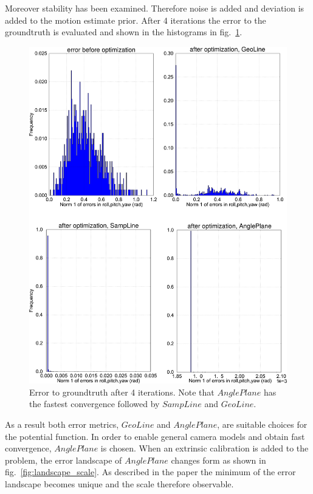 \documentclass[a4paper]{article}
\begin{document}
Moreover stability has been examined. Therefore noise is added and deviation is added to the motion estimate prior.
After 4 iterations the error to the groundtruth is evaluated and shown in the histograms in fig.~\ref{fig:histograms}.

\begin{figure}[htb]
\centering
\includegraphics[width=\textwidth]{histograms_all}%
\caption{Error to groundtruth after 4 iterations. Note that $AnglePlane$ has the fastest convergence followed by $SampLine$ and $GeoLine$.}
\label{fig:histograms}
\end{figure}

As a result both error metrics, $GeoLine$ and $AnglePlane$, are suitable choices for the potential function.
In order to enable general camera models and obtain fast convergence, $AnglePlane$ is chosen.
When an extrinsic calibration is added to the problem, the error landscape of $AnglePlane$ changes form as shown in fig.~\ref{fig:landscape_scale}.
As described in the paper the minimum of the error landscape becomes unique and the scale therefore observable. 
\end{document}
